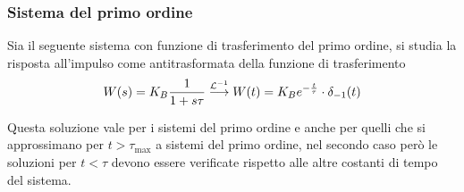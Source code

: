 \subsubsection{Sistema del primo ordine}
Sia il seguente sistema con funzione di trasferimento del primo ordine, si
studia la risposta all'impulso come antitrasformata della funzione di
trasferimento
$$
W(s) = K_B \frac{1}{1+s\tau} \stackrel{\mathcal{L}^{-1}}{\longrightarrow} W(t) = K_B
e^{-\frac{t}{\tau}}\cdot \delta_{-1}(t)
$$
\begin{figure}[h]
 \centering
\end{figure}
Questa soluzione vale per i sistemi del primo ordine e anche per quelli che si
approssimano per $t>\tau_{\text{max}}$ a sistemi del primo ordine, nel secondo
caso però le soluzioni per $t<\tau$ devono essere verificate rispetto alle
altre costanti di tempo del sistema.


